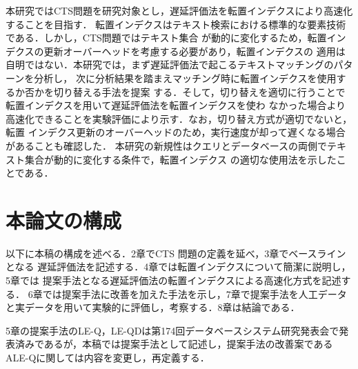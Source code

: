 本研究ではCTS問題を研究対象とし，遅延評価法を転置インデクスにより高速化することを目指す．
転置インデクスはテキスト検索における標準的な要素技術である．しかし，CTS問題ではテキスト集合
が動的に変化するため，転置インデクスの更新オーバーヘッドを考慮する必要があり，転置インデクスの
適用は自明ではない．本研究では，まず遅延評価法で起こるテキストマッチングのパターンを分析し，
次に分析結果を踏まえマッチング時に転置インデクスを使用するか否かを切り替える手法を提案
する．そして，切り替えを適切に行うことで転置インデクスを用いて遅延評価法を転置インデクスを使わ
なかった場合より高速化できることを実験評価により示す．なお，切り替え方式が適切でないと，転置
インデクス更新のオーバーヘッドのため，実行速度が却って遅くなる場合があることも確認した．
本研究の新規性はクエリとデータベースの両側でテキスト集合が動的に変化する条件で，転置インデクス
の適切な使用法を示したことである．


\section{本論文の構成}
以下に本稿の構成を述べる．2章でCTS 問題の定義を延べ，3章でベースラインとなる
遅延評価法を記述する．4章では転置インデクスについて簡潔に説明し，5章では
提案手法となる遅延評価法の転置インデクスによる高速化方式を記述する．
6章では提案手法に改善を加えた手法を示し，7章で提案手法を人工データと実データを用いて実験的に評価し，考察する．8章は結論である．

5章の提案手法のLE-Q，LE-QDは第174回データベースシステム研究発表会で発表済み\cite{me}であるが，本稿では提案手法として記述し，提案手法の改善案であるALE-Qに関しては内容を変更し，再定義する．